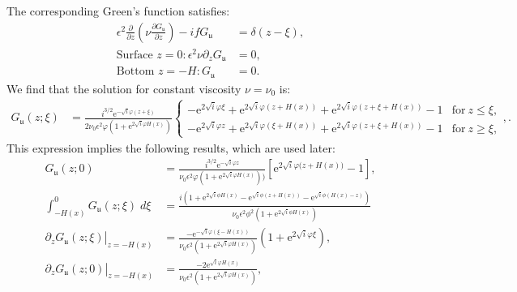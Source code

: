 \documentclass[10pt]{amsart}
\begin{document}
The corresponding Green's function satisfies:
\begin{align}
\epsilon^2 \frac{\partial}{\partial z} \left( \nu  \frac{\partial G_\mathfrak{u}}{\partial z} \right)  - i f  G_\mathfrak{u} & = \delta(z - \xi) ,  \\
\text{Surface~}z = 0:
\epsilon^2 \nu \partial_z G_\mathfrak{u} & = 0 ,
 \\
\text{Bottom~}z = -H:
G_\mathfrak{u} & = 0 .
\end{align}
We find that the solution for constant viscosity $\nu = \nu_0$ is:  
\begin{align}
 G_{ \mathfrak{u}}(z;\xi) & = 
\frac{ i^{3/2} \mathrm{e}^{- \sqrt{i} \varphi (z + \xi)} }{2  \nu_0 \epsilon^2 \varphi  \left(1 + \mathrm{e}^{2 \sqrt{i} \varphi H \left(x \right)} \right)}
\begin{cases} 
\displaystyle - \mathrm{e}^{2 \sqrt{i} \varphi \xi} + \mathrm{e}^{2 \sqrt{i} \varphi \left( z + H(x)\right)} + \mathrm{e}^{2 \sqrt{i} \varphi \left( z + \xi + H(x)\right)} - 1
 & \text{for}\: z \leq \xi , \\
\displaystyle - \mathrm{e}^{2 \sqrt{i} \varphi z} + \mathrm{e}^{2 \sqrt{i} \varphi \left( \xi + H(x)\right)} + \mathrm{e}^{2 \sqrt{i} \varphi \left( z + \xi + H(x)\right)} - 1
 & \text{for}\: z \geq \xi ,
\end{cases} , \label{eqn:FG_Gsfn} .
\end{align}
This expression implies the following results, which are used later:
\begin{align}
  G_{ \mathfrak{u}}(z;0) & = 
\frac{ i^{3/2} \mathrm{e}^{- \sqrt{i} \varphi z } }{ \nu_0 \epsilon^2 \varphi  \left(1 + \mathrm{e}^{2 \sqrt{i} \varphi H \left(x \right)} \right))}
\left[ \mathrm{e}^{2 \sqrt{i} \varphi ( z  + H{\left(x \right))}} - 1 \right] , \label{eqn:Guv0} \\
 \int_{-H(x)}^0 G_{ \mathfrak{u}}(z;\xi) \; d \xi & = 
 \frac{i  \left(  1 +  \mathrm{e}^{2 \sqrt{i} \phi  H(x)} -  \mathrm{e}^{\sqrt{i} \phi \left(  z + H(x) \right)} -  \mathrm{e}^{\sqrt{i} \phi \left( H(x) - z \right)} \right)  }{\nu_0 \epsilon^{2}  \phi^{2} \left( 1 + \mathrm{e}^{2 \sqrt{i} \phi H(x)} \right)}
\label{eqn:Guv_int_wrt_xi} \\
 \partial_z \left. G_{ \mathfrak{u}}(z;\xi) \right|_{z = -H(x)} & = 
\frac{- \mathrm{e}^{-\sqrt{i} \varphi (\xi - H(x))  } }{ \nu_0 \epsilon^2 \left(1 + \mathrm{e}^{2 \sqrt{i} \varphi H \left(x \right)} \right)}
\left( 1 + \mathrm{e}^{2 \sqrt{i} \varphi \xi}\right) , \label{eqn:FG_Gsfn_bottom_deriv} \\
 \partial_z \left. G_{ \mathfrak{u}}(z;0) \right|_{z = -H(x)} & = 
\frac{- 2 \mathrm{e}^{\sqrt{i} \varphi H(x)  } }{ \nu_0 \epsilon^2 \left(1 + \mathrm{e}^{2 \sqrt{i} \varphi H \left(x \right)} \right)}
 , \label{eqn:FG_Gsfn_bottom_deriv_top}
\end{align}
\end{document}
